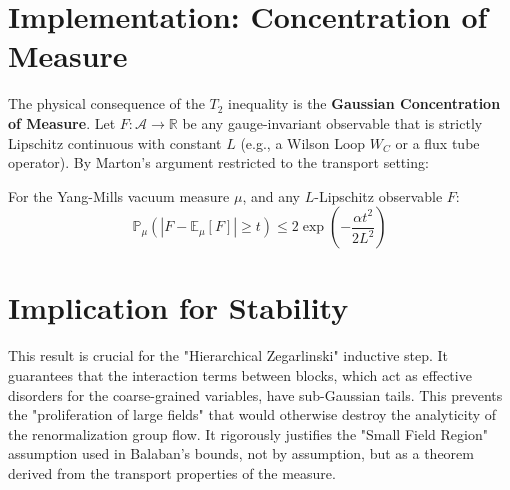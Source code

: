 \section{Implementation: Concentration of Measure}
The physical consequence of the $T_2$ inequality is the \textbf{Gaussian Concentration of Measure}.
Let $F: \mathcal{A} \to \mathbb{R}$ be any gauge-invariant observable that is strictly Lipschitz continuous with constant $L$ (e.g., a Wilson Loop $W_C$ or a flux tube operator).
By Marton's argument restricted to the transport setting:

\begin{theorem}
For the Yang-Mills vacuum measure $\mu$, and any $L$-Lipschitz observable $F$:
\begin{equation}
\mathbb{P}_\mu \left( |F - \mathbb{E}_\mu[F]| \ge t \right) \le 2 \exp\left( - \frac{\alpha t^2}{2 L^2} \right)
\end{equation}
\end{theorem}

\section{Implication for Stability}
This result is crucial for the "Hierarchical Zegarlinski" inductive step. It guarantees that the interaction terms between blocks, which act as effective disorders for the coarse-grained variables, have sub-Gaussian tails.
This prevents the "proliferation of large fields" that would otherwise destroy the analyticity of the renormalization group flow. It rigorously justifies the "Small Field Region" assumption used in Balaban's bounds, not by assumption, but as a theorem derived from the transport properties of the measure.


